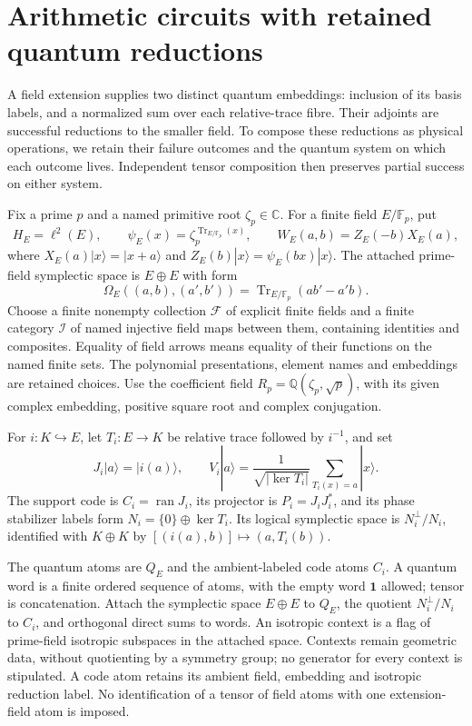 \section{Arithmetic circuits with retained quantum reductions}
\label{sec:arithmetic-processes}

A field extension supplies two distinct quantum embeddings: inclusion of its
basis labels, and a normalized sum over each relative-trace fibre. Their
adjoints are successful reductions to the smaller field. To compose these
reductions as physical operations, we retain their failure outcomes and the
quantum system on which each outcome lives. Independent tensor composition
then preserves partial success on either system.

\begin{definition}
Fix a prime $p$ and a named primitive root $\zeta_p\in\mathbb C$. For a finite
field $E/\mathbb F_p$, put
\[
 H_E=\ell^2(E),\qquad
 \psi_E(x)=\zeta_p^{\operatorname{Tr}_{E/\mathbb F_p}(x)},\qquad
 W_E(a,b)=Z_E(-b)X_E(a),
\]
where $X_E(a)|x\rangle=|x+a\rangle$ and
$Z_E(b)|x\rangle=\psi_E(bx)|x\rangle$. The attached prime-field symplectic
space is $E\oplus E$ with form
\[
 \Omega_E((a,b),(a',b'))=
 \operatorname{Tr}_{E/\mathbb F_p}(ab'-a'b).
\]
Choose a finite nonempty collection $\mathcal F$ of explicit finite fields
and a finite category $\mathcal I$ of named injective field maps between
them, containing identities and composites. Equality of field arrows means
equality of their functions on the named finite sets. The polynomial
presentations, element names and embeddings are retained choices. Use the
coefficient field $R_p=\mathbb Q(\zeta_p,\sqrt p)$, with its given complex
embedding, positive square root and complex conjugation.

For $i:K\hookrightarrow E$, let $T_i:E\to K$ be relative trace followed
by $i^{-1}$, and set
\[
 J_i|a\rangle=|i(a)\rangle,\qquad
 V_i|a\rangle=\frac{1}{\sqrt{|\ker T_i|}}
                  \sum_{T_i(x)=a}|x\rangle.
\]
The support code is $C_i=\operatorname{ran}J_i$, its projector is
$P_i=J_iJ_i^*$, and its phase stabilizer labels form
$N_i=\{0\}\oplus\ker T_i$. Its logical symplectic space is
$N_i^\perp/N_i$, identified with $K\oplus K$ by
$[(i(a),b)]\mapsto(a,T_i(b))$.

The quantum atoms are $Q_E$ and the ambient-labeled code atoms $C_i$.
A quantum word is a finite ordered sequence of atoms, with the empty word
$\mathbf1$ allowed; tensor is concatenation. Attach the symplectic space
$E\oplus E$ to $Q_E$, the quotient $N_i^\perp/N_i$ to $C_i$, and orthogonal
direct sums to words. An isotropic context is a flag of prime-field
isotropic subspaces in the attached space. Contexts remain geometric data,
without quotienting by a symmetry group; no generator for every context is
stipulated. A code atom retains its ambient field, embedding and isotropic
reduction label. No identification of a tensor of field atoms with one
extension-field atom is imposed.
\end{definition}

